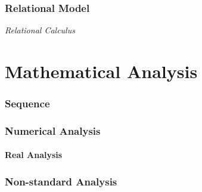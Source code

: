 \documentclass{article}
\begin{document}
\section{Relational Model}\label{sec:relational_model}

\emph{Relational Calculus}



\part{Mathematical Analysis}\label{sec:mathematical_analysis}



\section{Sequence}\label{sec:sequence}



\section{Numerical Analysis}\label{sec:numerical_analysis}

\subsection{Real Analysis}\label{subsec:real_analysis}



\section{Non-standard Analysis}\label{sec:nonstandard_analysis}
\end{document}
